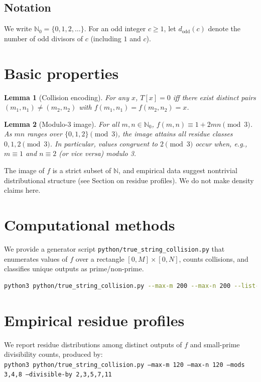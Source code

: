 \documentclass[12pt,a4paper]{article}
\newtheorem{lemma}{Lemma}[section]
\begin{document}
\subsection*{Notation}
We write \(\mathbb{N}_0=\{0,1,2,\dots\}\). For an odd integer \(c\ge 1\), let \(d_{\mathrm{odd}}(c)\) denote the number of odd divisors of \(c\) (including \(1\) and \(c\)).

\section{Basic properties}
\begin{lemma}[Collision encoding]\label{lem:collision}
For any \(x\), \(T[x]=0\) iff there exist distinct pairs \((m_1,n_1)\ne(m_2,n_2)\) with \(f(m_1,n_1)=f(m_2,n_2)=x\).
\end{lemma}

\begin{lemma}[Modulo-3 image]\label{lem:mod3}
For all \(m,n\in\mathbb{N}_0\), \(f(m,n) \equiv 1 + 2mn \pmod{3}\). As \(mn\) ranges over \(\{0,1,2\}\pmod{3}\), the image attains all residue classes \(0,1,2\pmod{3}\). In particular, values congruent to \(2\pmod{3}\) occur when, e.g., \(m\equiv 1\) and \(n\equiv 2\) (or vice versa) modulo 3.
\end{lemma}

\begin{remark}\label{rem:sparse}
The image of \(f\) is a strict subset of \(\mathbb{N}\), and empirical data suggest nontrivial distributional structure (see Section on residue profiles). We do not make density claims here.
\end{remark}

\section{Computational methods}
We provide a generator script \texttt{python/true\_string\_collision.py} that enumerates values of \(f\) over a rectangle \([0,M]\times[0,N]\), counts collisions, and classifies unique outputs as prime/non-prime.

\begin{lstlisting}[language=bash,caption=Example usage]
python3 python/true_string_collision.py --max-m 200 --max-n 200 --list-first 20
\end{lstlisting}

\section{Empirical residue profiles}
We report residue distributions among distinct outputs of \(f\) and small-prime divisibility counts, produced by:\\
\texttt{python3 python/true\_string\_collision.py --max-m 120 --max-n 120 --mods 3,4,8 --divisible-by 2,3,5,7,11}
\end{document}
